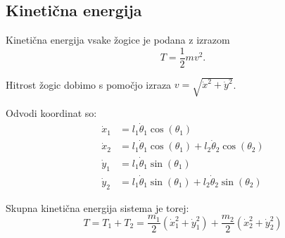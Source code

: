 \documentclass[a4paper,12pt]{article}
\begin{document}
\subsection*{Kinetična energija}

Kinetična energija vsake žogice je podana z izrazom $$T = \frac{1}{2} m v^2.$$

Hitrost žogic dobimo s pomočjo izraza $v = \sqrt{\dot{x}^2 + \dot{y}^2}$.

Odvodi koordinat so: \begin{align*}
\dot{x}_1 &= l_1 \dot{\theta}_1 \cos(\theta_1) \\
\dot{x}_2 &= l_1 \dot{\theta}_1 \cos(\theta_1) + l_2 \dot{\theta}_2 \cos(\theta_2) \\
\dot{y}_1 &= l_1 \dot{\theta}_1 \sin(\theta_1) \\
\dot{y}_2 &= l_1 \dot{\theta}_1 \sin(\theta_1) + l_2 \dot{\theta}_2 \sin(\theta_2)
\end{align*}

Skupna kinetična energija sistema je torej:
$$T = T_1 + T_2 = \frac{m_1}{2}(\dot{x}_1^2 + \dot{y}_1^2) + \frac{m_2}{2}(\dot{x}_2^2 + \dot{y}_2^2)$$
\end{document}
